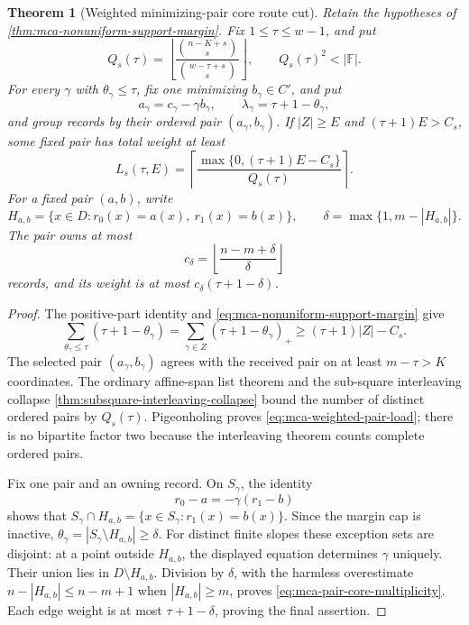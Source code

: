 \documentclass[11pt,a4paper]{amsart}
\numberwithin{equation}{section}
\newtheorem{theorem}{Theorem}[section]
\theoremstyle{remark}
\newcommand{\F}{\mathbb F}\newcommand{\B}{\mathbb B}\newcommand{\K}{\mathbb K}\newcommand{\Z}{\mathbb Z}
\begin{document}
\begin{theorem}[Weighted minimizing-pair core route cut]
\label{thm:mca-weighted-pair-core-route-cut}
Retain the hypotheses of
\cref{thm:mca-nonuniform-support-margin}.  Fix
\(1\le\tau\le w-1\), and put
\[
 Q_s(\tau)=\left\lfloor
  \frac{\binom{n-K+s}{s}}{\binom{w-\tau+s}{s}}
 \right\rfloor ,
 \qquad Q_s(\tau)^2<|\F|.
\]
For every \(\gamma\) with \(\theta_\gamma\le\tau\), fix one minimizing
\(b_\gamma\in C'\), and put
\[
 a_\gamma=c_\gamma-\gamma b_\gamma,
 \qquad \lambda_\gamma=\tau+1-\theta_\gamma,
\]
and group records by their ordered pair \((a_\gamma,b_\gamma)\).  If
\(|Z|\ge E\) and \((\tau+1)E>C_s\), some fixed pair has total weight at
least
\begin{equation}
 L_s(\tau,E)=\left\lceil
 \frac{\max\{0,(\tau+1)E-C_s\}}{Q_s(\tau)}
 \right\rceil .
 \label{eq:mca-weighted-pair-load}
\end{equation}
For a fixed pair \((a,b)\), write
\[
 H_{a,b}=\{x\in D:r_0(x)=a(x),\ r_1(x)=b(x)\},
 \qquad \delta=\max\{1,m-|H_{a,b}|\}.
\]
The pair owns at most
\begin{equation}
 c_\delta=\left\lfloor\frac{n-m+\delta}{\delta}\right\rfloor
 \label{eq:mca-pair-core-multiplicity}
\end{equation}
records, and its weight is at most
\(c_\delta(\tau+1-\delta)\).
\end{theorem}

\begin{proof}
The positive-part identity and
\eqref{eq:mca-nonuniform-support-margin} give
\[
 \sum_{\theta_\gamma\le\tau}
   (\tau+1-\theta_\gamma)
 =\sum_{\gamma\in Z}(\tau+1-\theta_\gamma)_+
 \ge (\tau+1)|Z|-C_s.
\]
The selected pair \((a_\gamma,b_\gamma)\) agrees with the received pair on
at least \(m-\tau>K\) coordinates.  The ordinary affine-span list theorem
and the sub-square interleaving collapse
\cref{thm:subsquare-interleaving-collapse} bound the number of distinct
ordered pairs by \(Q_s(\tau)\).  Pigeonholing proves
\eqref{eq:mca-weighted-pair-load}; there is no bipartite factor two because
the interleaving theorem counts complete ordered pairs.

Fix one pair and an owning record.  On \(S_\gamma\), the identity
\[
 r_0-a=-\gamma(r_1-b)
\]
shows that
\(S_\gamma\cap H_{a,b}=\{x\in S_\gamma:r_1(x)=b(x)\}\).  Since the margin
cap is inactive, \(\theta_\gamma=|S_\gamma\setminus H_{a,b}|\ge\delta\).
For distinct finite slopes these exception sets are disjoint: at a point
outside \(H_{a,b}\), the displayed equation determines \(\gamma\) uniquely.
Their union lies in \(D\setminus H_{a,b}\).  Division by \(\delta\), with
the harmless overestimate \(n-|H_{a,b}|\le n-m+1\) when
\(|H_{a,b}|\ge m\), proves \eqref{eq:mca-pair-core-multiplicity}.  Each
edge weight is at most \(\tau+1-\delta\), proving the final assertion.
\end{proof}
\end{document}
